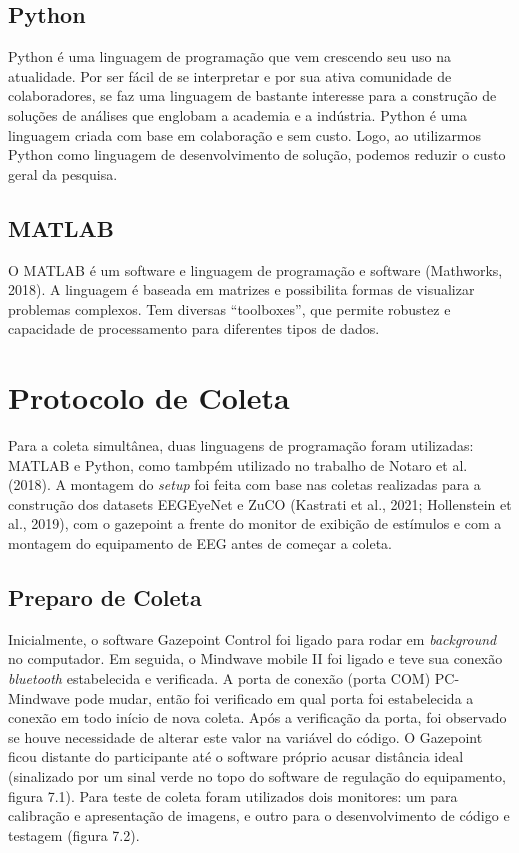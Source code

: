 \subsection{Python}
Python é uma linguagem de programação que vem crescendo seu uso na
atualidade. Por ser fácil de se interpretar e por sua ativa comunidade de
colaboradores, se faz uma linguagem de bastante interesse para a construção de
soluções de análises que englobam a academia e a indústria. Python é uma linguagem
criada com base em colaboração e sem custo. Logo, ao utilizarmos Python como
linguagem de desenvolvimento de solução, podemos reduzir o custo geral da
pesquisa.

\subsection{MATLAB}
O MATLAB é um software e linguagem de programação e software (Mathworks, 2018). A linguagem é baseada em matrizes e possibilita formas de visualizar
problemas complexos. Tem diversas “toolboxes”, que permite robustez e capacidade
de processamento para diferentes tipos de dados.

\section{Protocolo de Coleta}

Para a coleta simultânea, duas linguagens de programação foram utilizadas: MATLAB e Python, como tambpém 
utilizado no trabalho de Notaro et al. (2018).  
A montagem do \textit{setup} foi feita com base nas coletas realizadas para a construção dos datasets EEGEyeNet e 
ZuCO (Kastrati et al., 2021; Hollenstein et al., 2019), com o gazepoint a frente do monitor de exibição de estímulos
e com a montagem do equipamento de EEG antes de começar a coleta. 

\subsection{Preparo de Coleta}
Inicialmente, o software Gazepoint Control foi ligado para rodar em  \textit{background} no computador. 
Em seguida, o Mindwave mobile II foi ligado e teve sua conexão \textit{bluetooth} estabelecida e 
verificada. A porta de conexão (porta COM) PC-Mindwave pode mudar, 
então foi verificado em qual porta foi estabelecida a conexão 
em todo início de nova coleta. Após a verificação da porta, foi 
observado se houve necessidade de alterar
este valor na variável do código. O Gazepoint ficou distante do participante até o
software próprio acusar distância ideal (sinalizado por um sinal verde no topo do 
software de regulação do equipamento, figura 7.1).
Para teste de coleta foram utilizados dois monitores: um para calibração e apresentação de imagens,
e outro para o desenvolvimento de código e testagem (figura 7.2). 

